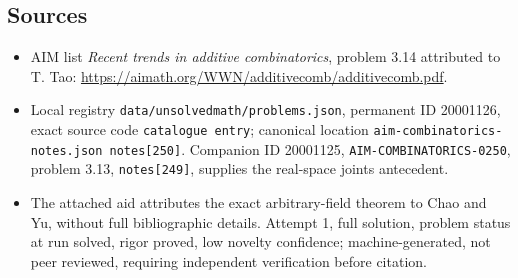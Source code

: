 \documentclass[11pt]{article}
\begin{document}
\subsection{Sources}
\begin{itemize}
\item AIM list \emph{Recent trends in additive combinatorics}, problem 3.14 attributed to T. Tao: \url{https://aimath.org/WWN/additivecomb/additivecomb.pdf}.
\item Local registry \texttt{data/unsolvedmath/problems.json}, permanent ID 20001126, exact source code \texttt{catalogue entry}; canonical location \texttt{aim-combinatorics-notes.json notes[250]}. Companion ID 20001125, \texttt{AIM-COMBINATORICS-0250}, problem 3.13, \texttt{notes[249]}, supplies the real-space joints antecedent.
\item The attached aid attributes the exact arbitrary-field theorem to Chao and Yu, without full bibliographic details. Attempt 1, full solution, problem status at run solved, rigor proved, low novelty confidence; machine-generated, not peer reviewed, requiring independent verification before citation.
\end{itemize}
\end{document}
